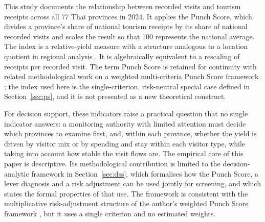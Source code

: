 \documentclass[11pt,a4paper]{article}
\theoremstyle{plain}\newtheorem{proposition}{Proposition}
\theoremstyle{definition}\newtheorem{definition}{Definition}
\begin{document}
This study documents the relationship between recorded visits and tourism receipts across all 77 Thai provinces in 2024. It applies the Punch Score, which divides a province's share of national tourism receipts by its share of national recorded visits and scales the result so that 100 represents the national average. The index is a relative-yield measure with a structure analogous to a location quotient in regional analysis \citep{isard1960}. It is algebraically equivalent to a rescaling of receipts per recorded visit. The term Punch Score is retained for continuity with related methodological work on a weighted multi-criteria Punch Score framework \citep{anon2026b,anon2026}; the index used here is the single-criterion, risk-neutral special case defined in Section~\ref{sec:ps}, and it is not presented as a new theoretical construct.

For decision support, these indicators raise a practical question that no single indicator answers: a monitoring authority with limited attention must decide which provinces to examine first, and, within each province, whether the yield is driven by visitor mix or by spending and stay within each visitor type, while taking into account how stable the visit flows are. The empirical core of this paper is descriptive. Its methodological contribution is limited to the decision-analytic framework in Section~\ref{sec:dss}, which formalises how the Punch Score, a lever diagnosis and a risk adjustment can be used jointly for screening, and which states the formal properties of that use. The framework is consistent with the multiplicative risk-adjustment structure of the author's weighted Punch Score framework \citep{anon2026b,anon2026}, but it uses a single criterion and no estimated weights.
\end{document}
